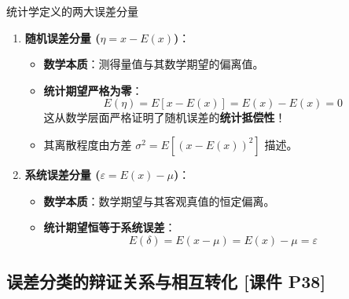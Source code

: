 \documentclass[11pt,a4paper]{ctexart}
\begin{document}
\begin{defbox}{统计学定义的两大误差分量}
\begin{enumerate}
    \item \textbf{随机误差分量 ($\eta = x - E(x)$)}：
    \begin{itemize}
        \item \textbf{数学本质}：测得量值与其数学期望的偏离值。
        \item \textbf{统计期望严格为零}：
        \begin{equation}
            E(\eta) = E[x - E(x)] = E(x) - E(x) = 0
        \end{equation}
        这从数学层面严格证明了随机误差的\textbf{统计抵偿性}！
        \item 其离散程度由方差 $\sigma^2 = E[(x - E(x))^2]$ 描述。
    \end{itemize}
    \item \textbf{系统误差分量 ($\varepsilon = E(x) - \mu$)}：
    \begin{itemize}
        \item \textbf{数学本质}：数学期望与其客观真值的恒定偏离。
        \item \textbf{统计期望恒等于系统误差}：
        \begin{equation}
            E(\delta) = E(x - \mu) = E(x) - \mu = \varepsilon
        \end{equation}
    \end{itemize}
\end{enumerate}
\end{defbox}

\subsection{误差分类的辩证关系与相互转化 \textnormal{[课件 P38]}}
\end{document}
